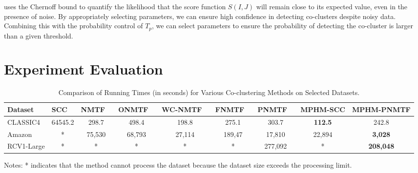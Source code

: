 \documentclass[journal]{IEEEtran}
\renewcommand{\cite}[1]{~\autocite{#1}}
\begin{document}
 uses the Chernoff bound to quantify the likelihood that the score function $S(I,J)$ will remain close to its expected value, even in the presence of noise. By appropriately selecting parameters, we can ensure high confidence in detecting co-clusters despite noisy data. Combining this with the probability control of $T_p$, we can select parameters to ensure the probability of detecting the co-cluster is larger than a given threshold.

\section{Experiment Evaluation}
\label{sec:experiment}


\begin{table}[htbp]
  \centering
  \caption{Comparison of Running Times (in seconds) for Various Co-clustering Methods on Selected Datasets.}
  \label{tab:running-time}
  \begin{tabular}{@{} l cccccccc @{}}
    \toprule
    Dataset    & SCC \cite{dhillon2001CoclusteringDocumentsWords}
               & NMTF \cite{long2005CoclusteringBlockValue}
               & ONMTF \cite{ding2006OrthogonalNonnegativeMatrix}
               & WC-NMTF \cite{salah2018WordCooccurrenceRegularized}
               & FNMTF \cite{kim2011FastNonnegativeMatrix}
               & PNMTF \cite{chen2023ParallelNonNegativeMatrix}      & \textbf{MPHM-SCC} & \textbf{MPHM-PNMTF}                                                                 \\
    \midrule
    CLASSIC4   & 64545.2                                             & 298.7             & 498.4               & 198.8  & 275.1  & 303.7   & \textbf{112.5} & 242.8            \\
    Amazon     & *                                                   & 75,530            & 68,793              & 27,114 & 189,47 & 17,810  & 22,894         & \textbf{3,028}   \\
    RCV1-Large & *                                                   & *                 & *                   & *      & *      & 277,092 & *              & \textbf{208,048} \\
    \bottomrule
  \end{tabular}
  \begin{tablenotes}
    \small
    \item Notes: * indicates that the method cannot process the dataset because the dataset size exceeds the processing limit.
  \end{tablenotes}
\end{table}
\end{document}
